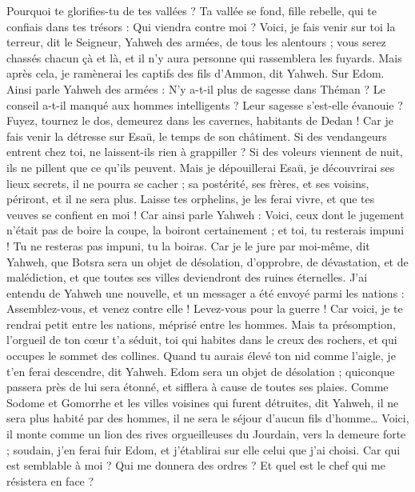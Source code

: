 \begin{multicols}{2}
Pourquoi te glorifies-tu de tes vallées ? Ta vallée se fond, fille rebelle, qui te confiais dans tes trésors : Qui viendra contre moi ?
Voici, je fais venir sur toi la terreur, dit le Seigneur, Yahweh des armées, de tous les alentours ; vous serez chassés chacun çà et là, et il n'y aura personne qui rassemblera les fuyards.
Mais après cela, je ramènerai les captifs des fils d'Ammon, dit Yahweh.
Sur Edom. Ainsi parle Yahweh des armées : N'y a-t-il plus de sagesse dans Théman ? Le conseil a-t-il manqué aux hommes intelligents ? Leur sagesse s'est-elle évanouie ?
Fuyez, tournez le dos, demeurez dans les cavernes, habitants de Dedan ! Car je fais venir la détresse sur Esaü, le temps de son châtiment.
Si des vendangeurs entrent chez toi, ne laissent-ils rien à grappiller ? Si des voleurs viennent de nuit, ils ne pillent que ce qu'ils peuvent.
Mais je dépouillerai Esaü, je découvrirai ses lieux secrets, il ne pourra se cacher ; sa postérité, ses frères, et ses voisins, périront, et il ne sera plus.
Laisse tes orphelins, je les ferai vivre, et que tes veuves se confient en moi !
Car ainsi parle Yahweh : Voici, ceux dont le jugement n'était pas de boire la coupe, la boiront certainement ; et toi, tu resterais impuni ! Tu ne resteras pas impuni, tu la boiras.
Car je le jure par moi-même, dit Yahweh, que Botsra sera un objet de désolation, d'opprobre, de dévastation, et de malédiction, et que toutes ses villes deviendront des ruines éternelles.
J'ai entendu de Yahweh une nouvelle, et un messager a été envoyé parmi les nations : Assemblez-vous, et venez contre elle ! Levez-vous pour la guerre !
Car voici, je te rendrai petit entre les nations, méprisé entre les hommes.
Mais ta présomption, l'orgueil de ton cœur t'a séduit, toi qui habites dans le creux des rochers, et qui occupes le sommet des collines. Quand tu aurais élevé ton nid comme l'aigle, je t'en ferai descendre, dit Yahweh.
Edom sera un objet de désolation ; quiconque passera près de lui sera étonné, et sifflera à cause de toutes ses plaies.
Comme Sodome et Gomorrhe et les villes voisines qui furent détruites, dit Yahweh, il ne sera plus habité par des hommes, il ne sera le séjour d'aucun fils d'homme…
Voici, il monte comme un lion des rives orgueilleuses du Jourdain, vers la demeure forte ; soudain, j'en ferai fuir Edom, et j'établirai sur elle celui que j'ai choisi. Car qui est semblable à moi ? Qui me donnera des ordres ? Et quel est le chef qui me résistera en face ?

\end{multicols}
